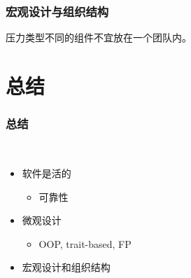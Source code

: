 \begin{frame}
    \frametitle{宏观设计与组织结构}
    \begin{corollary}
        压力类型不同的组件不宜放在一个团队内。
    \end{corollary}
\end{frame}

\section{总结}

\begin{frame}
    \frametitle{总结}
    \begin{block}{~}
        \begin{itemize}
            \item 软件是活的
                \begin{itemize}
                    \item 可靠性
                \end{itemize}
            \item 微观设计
                \begin{itemize}
                    \item OOP, trait-based, FP
                \end{itemize}
            \item 宏观设计和组织结构
        \end{itemize}
    \end{block}
\end{frame}

\begin{frame}
\end{frame}



